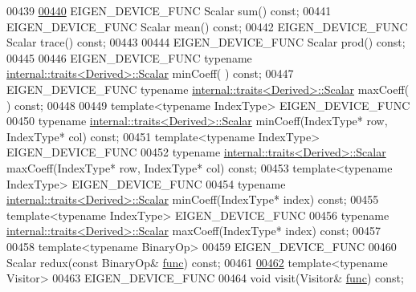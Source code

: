 \begin{DoxyCode}
00439 
\hyperlink{group___core___module_a84e5b32db338ec72142ac66fa9bc4786}{00440}     EIGEN\_DEVICE\_FUNC Scalar sum() \textcolor{keyword}{const};
00441     EIGEN\_DEVICE\_FUNC Scalar mean() \textcolor{keyword}{const};
00442     EIGEN\_DEVICE\_FUNC Scalar trace() \textcolor{keyword}{const};
00443 
00444     EIGEN\_DEVICE\_FUNC Scalar prod() \textcolor{keyword}{const};
00445 
00446     EIGEN\_DEVICE\_FUNC \textcolor{keyword}{typename} \hyperlink{struct_eigen_1_1internal_1_1traits}{internal::traits<Derived>::Scalar} minCoeff(
      ) \textcolor{keyword}{const};
00447     EIGEN\_DEVICE\_FUNC \textcolor{keyword}{typename} \hyperlink{struct_eigen_1_1internal_1_1traits}{internal::traits<Derived>::Scalar} maxCoeff(
      ) \textcolor{keyword}{const};
00448 
00449     \textcolor{keyword}{template}<\textcolor{keyword}{typename} IndexType> EIGEN\_DEVICE\_FUNC
00450     \textcolor{keyword}{typename} \hyperlink{struct_eigen_1_1internal_1_1traits}{internal::traits<Derived>::Scalar} minCoeff(IndexType* row, 
      IndexType* col) \textcolor{keyword}{const};
00451     \textcolor{keyword}{template}<\textcolor{keyword}{typename} IndexType> EIGEN\_DEVICE\_FUNC
00452     \textcolor{keyword}{typename} \hyperlink{struct_eigen_1_1internal_1_1traits}{internal::traits<Derived>::Scalar} maxCoeff(IndexType* row, 
      IndexType* col) \textcolor{keyword}{const};
00453     \textcolor{keyword}{template}<\textcolor{keyword}{typename} IndexType> EIGEN\_DEVICE\_FUNC
00454     \textcolor{keyword}{typename} \hyperlink{struct_eigen_1_1internal_1_1traits}{internal::traits<Derived>::Scalar} minCoeff(IndexType* index) \textcolor{keyword}{
      const};
00455     \textcolor{keyword}{template}<\textcolor{keyword}{typename} IndexType> EIGEN\_DEVICE\_FUNC
00456     \textcolor{keyword}{typename} \hyperlink{struct_eigen_1_1internal_1_1traits}{internal::traits<Derived>::Scalar} maxCoeff(IndexType* index) \textcolor{keyword}{
      const};
00457 
00458     \textcolor{keyword}{template}<\textcolor{keyword}{typename} BinaryOp>
00459     EIGEN\_DEVICE\_FUNC
00460     Scalar redux(\textcolor{keyword}{const} BinaryOp& \hyperlink{structfunc}{func}) \textcolor{keyword}{const};
00461 
\hyperlink{group___core___module_adfabe2228a3ff52ad88e51675aa31557}{00462}     \textcolor{keyword}{template}<\textcolor{keyword}{typename} Visitor>
00463     EIGEN\_DEVICE\_FUNC
00464     \textcolor{keywordtype}{void} visit(Visitor& \hyperlink{structfunc}{func}) \textcolor{keyword}{const};

\end{DoxyCode}
